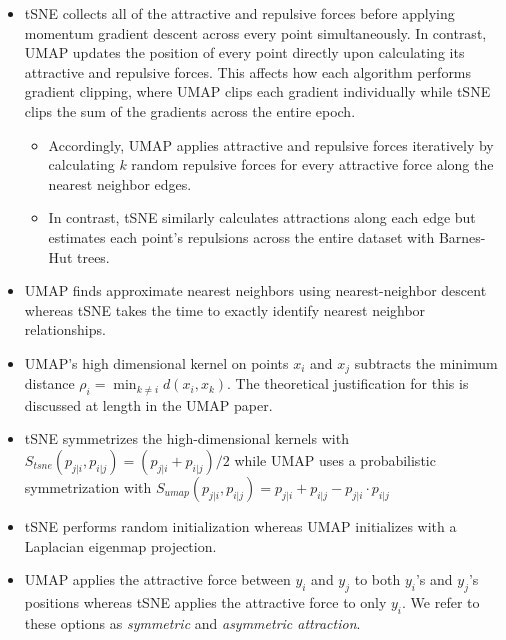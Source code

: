 \documentclass{article}
\theoremstyle{definition}
\begin{document}
\begin{multicols}{2}
\begin{itemize}
    \item tSNE collects all of the attractive and repulsive forces before applying momentum gradient descent across every point simultaneously. In contrast,
        UMAP updates the position of every point directly upon calculating its attractive and repulsive forces. This affects how each algorithm performs gradient clipping, where UMAP clips each gradient individually while tSNE clips
        the sum of the gradients across the entire epoch.
    \begin{itemize}
        \item Accordingly, UMAP applies attractive and repulsive forces iteratively by calculating $k$ random repulsive forces for every attractive force along the
            nearest neighbor edges.
        \item In contrast, tSNE similarly calculates attractions along each edge but estimates each point's repulsions across the entire dataset with Barnes-Hut
            trees.
    \end{itemize}

    \item UMAP finds approximate nearest neighbors using nearest-neighbor descent whereas tSNE takes the time to exactly identify nearest neighbor relationships.

    \item UMAP's high dimensional kernel on points $x_i$ and $x_j$ subtracts the minimum distance $\rho_i = \min_{k \neq i} d(x_i, x_k)$. The theoretical
        justification for this is discussed at length in the UMAP paper. 

    \item tSNE symmetrizes the high-dimensional kernels with $S_{tsne}(p_{j|i}, p_{i|j}) = (p_{j|i} + p_{i|j}) / 2$ while UMAP uses a probabilistic
        symmetrization with $S_{umap}(p_{j|i}, p_{i|j}) = p_{j|i} + p_{i|j} - p_{j|i} \cdot p_{i|j}$

    \item tSNE performs random initialization whereas UMAP initializes with a Laplacian eigenmap projection.

    \item UMAP applies the attractive force between $y_i$ and $y_j$ to both $y_i$'s and $y_j$'s positions whereas tSNE applies the attractive force to only $y_i$.
        We refer to these options as \textit{symmetric} and \textit{asymmetric attraction}.
\end{itemize}


\end{multicols}
\end{document}
